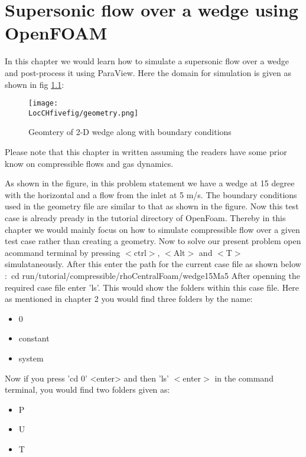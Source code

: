 \chapter{Supersonic flow over a wedge using OpenFOAM}
\thispagestyle{empty}
\label{sec:chap5}
\newcommand{\LocCHfivefig}{\Origin/CHAPTERS/chap5/figures}


In this chapter we would learn how to simulate a supersonic flow over a wedge and post-process it using ParaView. Here the domain for simulation is given as shown in fig \ref{geometry}$:$

\begin{figure}[ht]  
\begin{center}  
\texttt{[image: \\LocCHfivefig/geometry.png]}
\caption{Geomtery of 2-D wedge along with boundary conditions}
\label{geometry}
\end{center}  
\end{figure}

\flushleft Please note that this chapter in written assuming the readers have some prior know on compressible flows and gas dynamics.

\flushleft As shown in the figure, in this problem statement we have a wedge at 15 degree with the horizontal and a flow from the inlet at 5 m/s. The boundary conditions used in the geometry file are similar to that as shown in the figure. Now this test case is already pready in the tutorial directory of OpenFoam. Thereby in this chapter we would mainly focus on how to simulate compressible flow over a given test case rather than creating a geometry. 
\flushleft Now to solve our present problem open acommand terminal by pressing $<$ctrl$>$, $<$Alt$>$ and $<$T$>$ simulataneously. After this enter the path for the current case file as shown below$:$
\flushleft cd run/tutorial/compressible/rhoCentralFoam/wedge15Ma5
\flushleft After openning the required case file enter 'ls'. This would show the folders within this case file. Here as mentioned in chapter 2 you would find three folders by the name$:$

\begin{itemize}
  \item 0
  \item constant
  \item system
\end{itemize}

\flushleft Now if you press 'cd 0' <enter> and then 'ls' $<$enter$>$ in the command terminal, you would find two folders given as:

\begin{itemize}
  \item P
  \item U
  \item T
\end{itemize}

